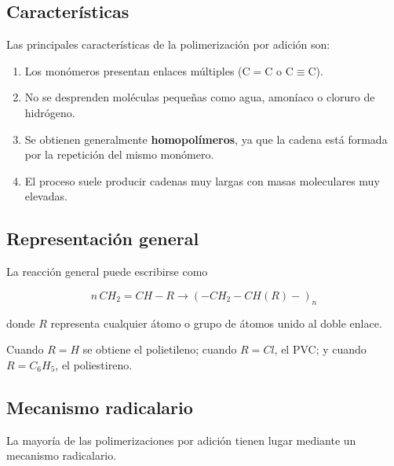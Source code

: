 
\subsection{Características}

Las principales características de la polimerización por adición son:

\begin{enumerate}[label=\alph*)]

\item Los monómeros presentan enlaces múltiples (\(\mathrm{C=C}\) o
\(\mathrm{C\equiv C}\)).

\item No se desprenden moléculas pequeñas como agua, amoníaco o cloruro de
hidrógeno.

\item Se obtienen generalmente \textbf{homopolímeros}, ya que la cadena está formada
por la repetición del mismo monómero.

\item El proceso suele producir cadenas muy largas con masas moleculares muy
elevadas.

\end{enumerate}


\subsection{Representación general}

La reacción general puede escribirse como

\[
n\,CH_2=CH-R
\longrightarrow
(-CH_2-CH(R)-)_n
\]

donde \(R\) representa cualquier átomo o grupo de átomos unido al doble enlace.

Cuando \(R=H\) se obtiene el polietileno; cuando \(R=Cl\), el PVC; y cuando
\(R=C_6H_5\), el poliestireno.


\subsection{Mecanismo radicalario}

La mayoría de las polimerizaciones por adición tienen lugar mediante un mecanismo
radicalario.

